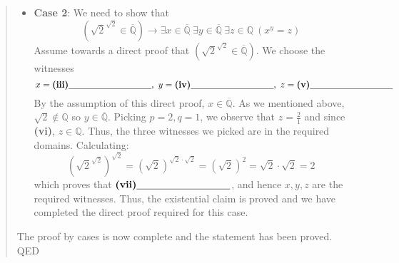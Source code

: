 \begin{enumerate}
\begin{enumerate}
\begin{quote}
\begin{itemize}
        \item {\bf Case 2}: We need to show that 
        \[
            (\sqrt{2}^{\sqrt{2}} \in \overline{\mathbb{Q}}) \to 
            \exists x \in \overline{\mathbb{Q}}~ \exists y \in \overline{\mathbb{Q}} 
            ~\exists z\in \mathbb{Q} ~(x^y = z)
        \]
        Assume towards a direct proof that $(\sqrt{2}^{\sqrt{2}} \in \overline{\mathbb{Q}})$. We
        choose the witnesses 
        \[
        x = \textbf{(iii)}\underline{\phantom{\hspace{1.3in}}}, ~y = 
        \textbf{(iv)}\underline{\phantom{\hspace{1.3in}}}, ~z = \textbf{(v)}\underline{\phantom{\hspace{1.3in}}}
        \]  
        By the assumption of this direct proof, $x \in \overline{\mathbb{Q}}$. As we mentioned above, $\sqrt{2} \notin \mathbb{Q}$ so $y \in \overline{\mathbb{Q}}$. Picking $p = 2, q = 1$, we observe that $z = \frac{2}{1}$
        and since \textbf{(vi)}\underline{\phantom{\hspace{1.3in}}}, $z \in \mathbb{Q}$.  Thus, the 
        three witnesses we picked are in the required domains. 
        Calculating: 
        \[
        \left( \sqrt{2}^{\sqrt{2}}\right)^{\sqrt{2}} = \left( \sqrt{2} \right)^{\sqrt{2} \cdot \sqrt{2} }
        = \left(\sqrt{2} \right)^2 = \sqrt{2} \cdot \sqrt{2} = 2
        \]
        which proves that $\textbf{(vii)}\underline{\phantom{\hspace{1.3in}}}$, and hence $x,y,z$ are 
        the required witnesses. Thus, the existential claim
        is proved and we have completed the direct proof required for this case.
        \end{itemize}
        The proof by cases is now complete and the statement has been proved. QED
        \end{quote}

   \end{enumerate}
   

\end{enumerate}
